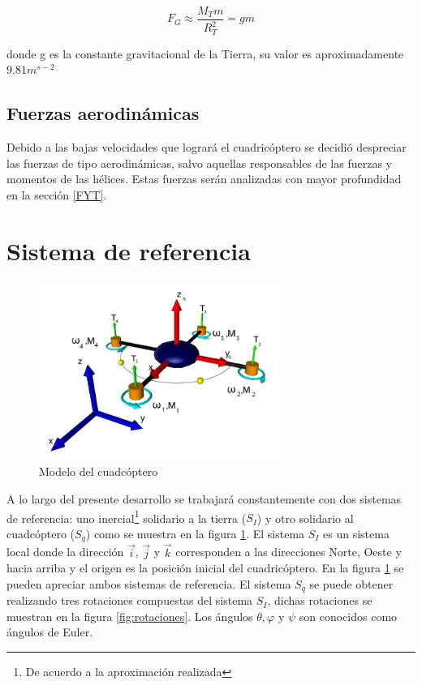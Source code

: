 \documentclass[main]{subfiles}
\begin{document}
\begin{equation}
F_G\approx\frac{M_Tm}{R_T^2}=gm
\end{equation}

donde g es la constante gravitacional de la Tierra, su valor es aproximadamente $9.81m^{s-2}$

\subsection{Fuerzas aerodin\'amicas}
Debido a las bajas velocidades que lograr\'a el cuadric\'optero se decidi\'o despreciar las fuerzas de tipo aerodin\'amicas, salvo aquellas responsables de las fuerzas y momentos de las h\'elices. Estas fuerzas ser\'an analizadas con mayor profundidad en la secci\'on \ref{FYT}.
\section{Sistema de referencia}

\begin{figure}
	\centering
	\includegraphics[width=0.7\textwidth]{./pics_modelo_fisico/quad_coord.jpg}
	\caption{Modelo del cuadc\'optero	}
	\label{fig:quad}
\end{figure}

A lo largo del presente desarrollo se trabajar\'a constantemente con dos sistemas de referencia: uno inercial\footnote{De acuerdo a la aproximaci\'on realizada} solidario a la tierra ($S_I$) y otro solidario al cuadc\'optero ($S_q$) como se muestra en la figura \ref{fig:quad}. El sistema $S_I$ es un sistema local donde la direcci\'on $\vec{i}$, $\vec{j}$ y $\vec{k}$ corresponden a las direcciones Norte, Oeste y hacia arriba y el origen es la posici\'on inicial del cuadric\'optero. En la figura \ref{fig:quad} se pueden apreciar ambos sistemas de referencia.
El sistema $S_q$ se puede obtener realizando tres rotaciones compuestas del sistema $S_I$, dichas rotaciones se muestran en la figura \ref{fig:rotaciones}. Los \'angulos $\theta, \varphi$ y $\psi$ son conocidos como \'angulos de Euler.
\end{document}
